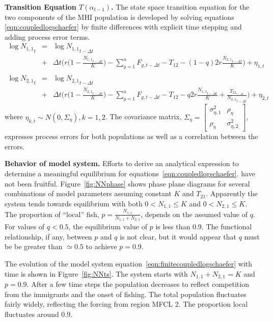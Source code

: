 \documentclass[12pt,letterpaper,twoside]{article}
\newcommand\None{{N_{1,1}}}
\newcommand\Ntwo{{N_{2,1}}}
\newcommand\Nsum{{N_{1,1}+N_{2,1}}}
\begin{document}
{\bf Transition Equation $T(\alpha_{t-1})$.}
The state space transition equation for the two components of the MHI
population is developed by solving
equations \ref{eqn:coupledlogschaefer} by finite differences
with explicit time stepping and adding process error
terms.
\begin{eqnarray}
\log \None_t &=& \log \None_{t-\Delta t}\nonumber\\ 
             &+&\Delta t\bigg(r\Big(1-\frac{\None_{t-\Delta t}}{K}\Big)
-\sum_{g=1}^n F_{g,t-\Delta t} - T_{12} - (1-q)2r\frac{\Ntwo_{t-\Delta
t}}{K}\bigg)+\eta_{1,t}\nonumber\\
\\ \log \Ntwo_t &=& \log \Ntwo_{t-\Delta t}\nonumber\\
             &+&\Delta t\bigg(r\Big(1-\frac{\Ntwo_{t-\Delta t}}{K}\Big)
-\sum_{g=1}^n F_{g,t-\Delta t} - T_{12} - q2r\frac{\None_{t-\Delta t}}{K}
     +\frac{T_{{21}_{t-\Delta t}}}{\Ntwo_{t-\Delta t}}\bigg)+\eta_{2,t}\nonumber
\end{eqnarray}
where $\eta_{k,t} \sim N(0,\Sigma_\eta),k=1,2$. The covariance matrix,
$\Sigma_\eta = \left[\begin{array}{cc}\sigma^2_{\eta,1}&\rho_\eta\\
                                     \rho_\eta&\sigma^2_{\eta,2}
\end{array}\right]$,
expresses process errors for both populations as well as a
correlation between the errors.

{\bf Behavior of model system.}
Efforts to derive an analytical expression to determine 
a meaningful equilibrium for equations~\ref{eqn:coupledlogschaefer}.
have not been fruitful.
Figure~\ref{fig:NNphase} shows phase plane diagrams for several
combinations of model parameters assuming constant $K$ and
$T_{21}$. Apparently the system tends towards
equilibrium with both $0 < \None \le K$ and $0 < \Ntwo \le K$.
The proportion of ``local'' fish, $p = \frac{\None}{\Nsum}$, depends on
the assumed value of $q$. For values of $q < 0.5$, the equilibrium
value of $p$ is less than 0.9. The functional relationship, if any,
between $p$ and $q$ is not clear, but it would appear that $q$ must be
be greater than $\simeq 0.5$ to achieve $p=0.9$.

The evolution of the model system
equation~\ref{eqn:finitecoupledlogschaefer} with time is shown in
Figure~\ref{fig:NNts}. The system starts with $\None + \Ntwo = K$ and
$p=0.9$. After a few time steps the population decreases to reflect
competition from the immigrants and the onset of fishing.
The total population fluctuates fairly widely, reflecting the forcing
from region MFCL 2. The proportion local fluctuates around 0.9.
\end{document}

